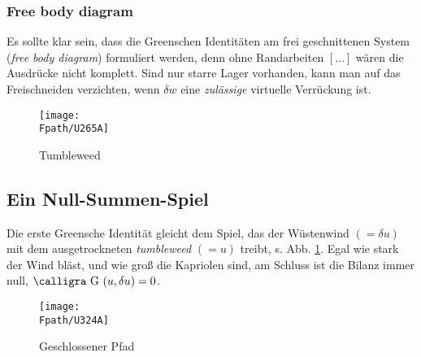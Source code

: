 {{{{{\textcolor{sectionTitleBlue}{\subsubsection*{Free body diagram}}}
Es sollte klar sein, dass die Greenschen Identit\"{a}ten am frei geschnittenen System ({\em free body diagram\/}) formuliert werden, denn ohne Randarbeiten $[\ldots ]$ w\"{a}ren die Ausdr\"{u}cke nicht komplett. Sind nur starre Lager vorhanden, kann man auf das Freischneiden verzichten, wenn $\delta w$ eine {\em zul\"{a}ssige\/} virtuelle Verr\"{u}ckung ist.

\begin{figure}[tbp]
\centering
\if {} \sidecaption \fi
\texttt{[image: \\Fpath/U265A]}
\caption{Tumbleweed} \label{U265}
\end{figure}%

{\textcolor{sectionTitleBlue}{\section{Ein Null-Summen-Spiel}}}

Die erste Greensche Identit\"{a}t gleicht dem Spiel, das der W\"{u}stenwind $(= \delta u)$ mit dem ausgetrockneten {\em tumbleweed\/} $(= u)$ treibt, s. Abb. \ref{U265}. Egal wie stark der Wind bl\"{a}st, und wie gro{\ss} die Kapriolen sind, am Schluss ist die Bilanz immer null,  $\text{\normalfont\calligra G\,\,}(u,\delta u) = 0$.

\begin{figure}[tbp]
\centering
\if {} \sidecaption \fi
\texttt{[image: \\Fpath/U324A]}
\caption{Geschlossener Pfad} \label{U324}
\end{figure}%

}}}}
